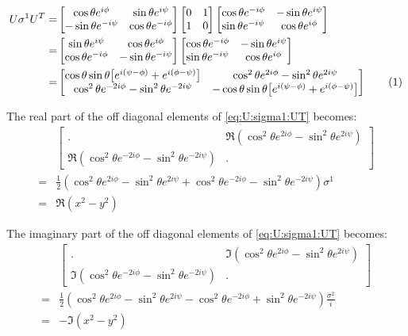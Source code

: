 \documentclass[]{article}
\newcommand\numberthis{\addtocounter{equation}{1}\tag{\theequation}}
\begin{document}
\begin{align*}
	U \sigma^1 U^T  =&  \begin{bmatrix}
		\cos{\theta} e^{i\phi}&\sin{\theta}e^{i\psi}\\
		-\sin{\theta}e^{-i\psi}&\cos{\theta} e^{-i\phi}
	\end{bmatrix} \begin{bmatrix}
		0&1\\
		1&0
	\end{bmatrix} \begin{bmatrix}
		\cos{\theta} e^{-i\phi}&-\sin{\theta}e^{i\psi}\\
		\sin{\theta}e^{-i\psi}&\cos{\theta} e^{i\phi}
	\end{bmatrix}\\
	=&  \begin{bmatrix}
		\sin{\theta}e^{i\psi} & \cos{\theta} e^{i\phi}\\
		\cos{\theta} e^{-i\phi}&-\sin{\theta}e^{-i\psi}
	\end{bmatrix} \begin{bmatrix}
		\cos{\theta} e^{-i\phi}&-\sin{\theta}e^{i\psi}\\
		\sin{\theta}e^{-i\psi}&\cos{\theta} e^{i\phi}
	\end{bmatrix}\\
	=& \begin{bmatrix}
		\cos\theta \sin\theta\big[e^{i(\psi-\phi)}+e^{i(\phi-\psi)}\big]&\cos^2\theta e^{2i\phi}-\sin^2\theta e^{2i\psi} \\
		\cos^2\theta e^{-2i\phi}-\sin^2\theta e^{-2i\psi}&-\cos\theta \sin\theta\big[e^{i(\psi-\phi)}+e^{i(\phi-\psi)}\big]
	\end{bmatrix} \numberthis \label{eq:U:sigma1:UT}
\end{align*}

The real part of the off diagonal elements of \eqref{eq:U:sigma1:UT} becomes:
\begin{align*}
	&\begin{bmatrix}
		.&\Re(\cos^2\theta e^{2i\phi}-\sin^2\theta e^{2i\psi}) \\
		\Re(\cos^2\theta e^{-2i\phi}-\sin^2\theta e^{-2i\psi})&.
	\end{bmatrix}\\
	=& \frac{1}{2}(\cos^2\theta e^{2i\phi}-\sin^2\theta e^{2i\psi}+ \cos^2\theta e^{-2i\phi}-\sin^2\theta e^{-2i\psi}) \sigma^1	\\
	=& \Re(x^2-y^2)	
\end{align*}

The imaginary part of the off diagonal elements of \eqref{eq:U:sigma1:UT} becomes:
\begin{align*}
	&\begin{bmatrix}
		.&\Im(\cos^2\theta e^{2i\phi}-\sin^2\theta e^{2i\psi}) \\
		\Im(\cos^2\theta e^{-2i\phi}-\sin^2\theta e^{-2i\psi})&.
	\end{bmatrix}\\
	=& \frac{1}{2}(\cos^2\theta e^{2i\phi}-\sin^2\theta e^{2i\psi}- \cos^2\theta e^{-2i\phi}+\sin^2\theta e^{-2i\psi}) \frac{\sigma^2}{i}	\\
	=& -\Im(x^2-y^2)	
\end{align*}
\end{document}
